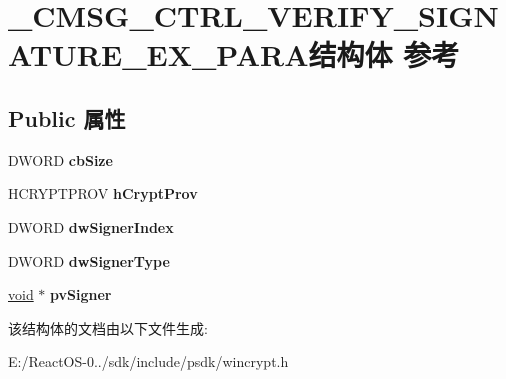 \hypertarget{struct___c_m_s_g___c_t_r_l___v_e_r_i_f_y___s_i_g_n_a_t_u_r_e___e_x___p_a_r_a}{}\section{\+\_\+\+C\+M\+S\+G\+\_\+\+C\+T\+R\+L\+\_\+\+V\+E\+R\+I\+F\+Y\+\_\+\+S\+I\+G\+N\+A\+T\+U\+R\+E\+\_\+\+E\+X\+\_\+\+P\+A\+R\+A结构体 参考}
\label{struct___c_m_s_g___c_t_r_l___v_e_r_i_f_y___s_i_g_n_a_t_u_r_e___e_x___p_a_r_a}
\subsection*{Public 属性}
\begin{DoxyCompactItemize}
\item 
\mbox{\label{struct___c_m_s_g___c_t_r_l___v_e_r_i_f_y___s_i_g_n_a_t_u_r_e___e_x___p_a_r_a_a54e34857d7b0a592a2e3e1257d1215e8}} 
D\+W\+O\+RD {\bfseries cb\+Size}
\item 
\mbox{\label{struct___c_m_s_g___c_t_r_l___v_e_r_i_f_y___s_i_g_n_a_t_u_r_e___e_x___p_a_r_a_a8ab5e49fc8b21fabd6ca4cadd7da9cac}} 
H\+C\+R\+Y\+P\+T\+P\+R\+OV {\bfseries h\+Crypt\+Prov}
\item 
\mbox{\label{struct___c_m_s_g___c_t_r_l___v_e_r_i_f_y___s_i_g_n_a_t_u_r_e___e_x___p_a_r_a_a51b3efdd231aeaeab9ca21f65442cc16}} 
D\+W\+O\+RD {\bfseries dw\+Signer\+Index}
\item 
\mbox{\label{struct___c_m_s_g___c_t_r_l___v_e_r_i_f_y___s_i_g_n_a_t_u_r_e___e_x___p_a_r_a_a4f2b64e5c13b5757715fdccada84e2c6}} 
D\+W\+O\+RD {\bfseries dw\+Signer\+Type}
\item 
\mbox{\label{struct___c_m_s_g___c_t_r_l___v_e_r_i_f_y___s_i_g_n_a_t_u_r_e___e_x___p_a_r_a_a65a659c34e24b9fbeb99682729cb314b}} 
\hyperlink{interfacevoid}{void} $\ast$ {\bfseries pv\+Signer}
\end{DoxyCompactItemize}


该结构体的文档由以下文件生成\+:\begin{DoxyCompactItemize}
\item 
E\+:/\+React\+O\+S-\/0../sdk/include/psdk/wincrypt.\+h\end{DoxyCompactItemize}
